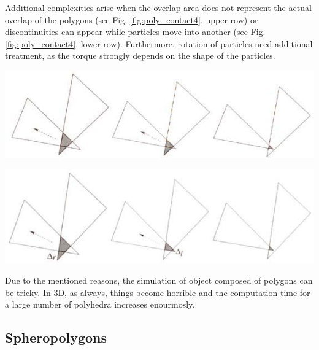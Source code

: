 \vspace{0.1cm}
\noindent
\begin{minipage}{\textwidth}
\begin{minipage}{0.35\textwidth}
Additional complexities arise when the overlap area does not represent the actual overlap of the polygons (see Fig. \ref{fig:poly_contact4}, upper row) or discontinuities can appear while particles move into another (see Fig. \ref{fig:poly_contact4}, lower row). Furthermore, rotation of particles need additional treatment, as the torque strongly depends on the shape of the particles.
\end{minipage}
\begin{minipage}{0.65\textwidth}
\begin{minipage}{.85\textwidth}
  \centering
  \includegraphics[width=.75\textwidth]{pics/poly_contact3.jpeg}
\end{minipage}
\begin{minipage}{.85\textwidth}
  \centering
  \includegraphics[width=.75\textwidth]{pics/poly_contact4.jpeg}
  \label{fig:poly_contact4}
\end{minipage}
\end{minipage}
\end{minipage}
\vspace{0.1cm}

Due to the mentioned reasons, the simulation of object composed of polygons can be tricky. In 3D, as always, things become horrible and the computation time for a large number of polyhedra increases enourmosly. 






\subsection{Spheropolygons}

